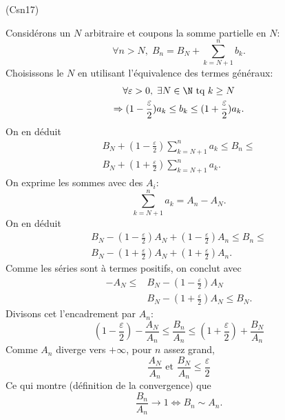 \begin{tiny}(Csn17)\end{tiny} Considérons un $N$ arbitraire et coupons la somme partielle en $N$:
\[
 \forall n >N, \;
 B_n = B_N + \sum_{k = N +1}^{n} b_k .
\]
Choisissons le $N$ en utilisant l'équivalence des termes généraux:
\begin{multline*}
 \forall \varepsilon >0, \; \exists N\in \N \text{ tq }
 k\geq N \\
 \Rightarrow 
 (1-\frac{\varepsilon}{2})a_k \leq b_k \leq (1+\frac{\varepsilon}{2})a_k.
\end{multline*}
On en déduit
\begin{multline*}
 B_N + (1-\frac{\varepsilon}{2})\sum_{k=N+1}^{n}a_k
 \leq B_n \leq  \\
 B_N + (1+\frac{\varepsilon}{2})\sum_{k=N+1}^{n}a_k.
\end{multline*}
On exprime les sommes avec des $A_i$:
\[
 \sum_{k=N+1}^{n}a_k = A_n - A_N.
\]
On en déduit
\begin{multline*}
 B_N - (1-\frac{\varepsilon}{2})A_N + (1-\frac{\varepsilon}{2})A_n 
 \leq B_n \leq  \\
 B_N - (1+\frac{\varepsilon}{2})A_N + (1+\frac{\varepsilon}{2})A_n.
\end{multline*}
Comme les séries sont à termes positifs, on conclut avec
\begin{align*}
 -A_N \leq &B_N - (1-\frac{\varepsilon}{2})A_N \\
 &B_N - (1+\frac{\varepsilon}{2})A_N \leq B_N .
\end{align*}
Divisons cet l'encadrement par $A_n$:
\[
 (1-\frac{\varepsilon}{2}) - \frac{A_N}{A_n}
 \leq \frac{B_n}{A_n} \leq
 (1+\frac{\varepsilon}{2}) + \frac{B_N}{A_n}
\]
Comme $A_n$ diverge vers $+\infty$, pour $n$ assez grand,
\[
 \frac{A_N}{A_n} \text{ et } \frac{B_N}{A_n}\leq \frac{\varepsilon}{2} 
\]
Ce qui montre (définition de la convergence) que
\[
 \frac{B_n}{A_n}\rightarrow 1 \Leftrightarrow B_n \sim A_n.
\]
